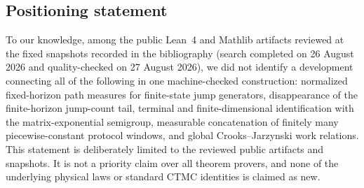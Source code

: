 \subsection{Positioning statement}

To our knowledge, among the public Lean~4 and Mathlib artifacts reviewed at the fixed snapshots recorded in the bibliography (search completed on 26 August 2026 and quality-checked on 27 August 2026), we did not identify a development connecting all of the following in one machine-checked construction: normalized fixed-horizon path measures for finite-state jump generators, disappearance of the finite-horizon jump-count tail, terminal and finite-dimensional identification with the matrix-exponential semigroup, measurable concatenation of finitely many piecewise-constant protocol windows, and global Crooks--Jarzynski work relations. This statement is deliberately limited to the reviewed public artifacts and snapshots. It is not a priority claim over all theorem provers, and none of the underlying physical laws or standard CTMC identities is claimed as new.
